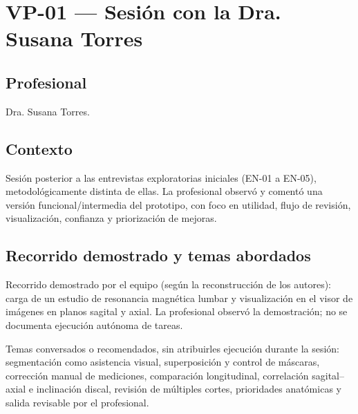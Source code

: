 \section{VP-01 --- Sesión con la Dra. Susana Torres}
\label{anexo:h-vp01-torres}

\subsection*{Profesional}
Dra. Susana Torres.

\subsection*{Contexto}
Sesión posterior a las entrevistas exploratorias iniciales (EN-01 a EN-05), metodológicamente distinta de ellas. La profesional observó y comentó una versión funcional/intermedia del prototipo, con foco en utilidad, flujo de revisión, visualización, confianza y priorización de mejoras.

\subsection*{Recorrido demostrado y temas abordados}
Recorrido demostrado por el equipo (según la reconstrucción de los autores): carga de un estudio de resonancia magnética lumbar y visualización en el visor de imágenes en planos sagital y axial. La profesional observó la demostración; no se documenta ejecución autónoma de tareas.

Temas conversados o recomendados, sin atribuirles ejecución durante la sesión: segmentación como asistencia visual, superposición y control de máscaras, corrección manual de mediciones, comparación longitudinal, correlación sagital--axial e inclinación discal, revisión de múltiples cortes, prioridades anatómicas y salida revisable por el profesional.

